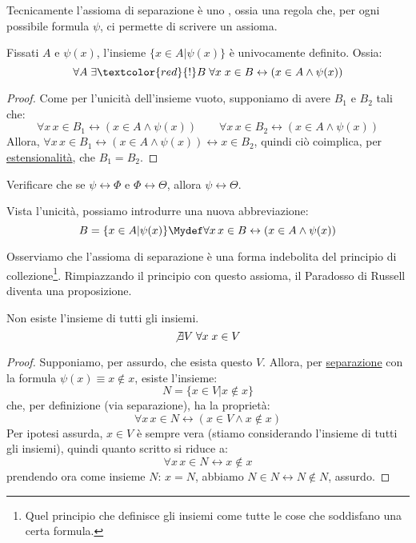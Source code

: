 \documentclass[11pt]{scrartcl}
\begin{document}
\begin{note}
Tecnicamente l'assioma di separazione è uno , ossia una regola che, per ogni possibile formula $\psi$, ci permette di scrivere un assioma.
\end{note}

\begin{proposition}
Fissati $A$ e $\psi(x)$, l'insieme $\{x \in A | \psi(x)\}$ è univocamente definito. Ossia:
\[ \forall A \; \exists \textcolor{red}{!} B \; \forall x \; x \in B \leftrightarrow (x \in A \land \psi(x))
	\]
\end{proposition}

\begin{proof}
Come per l'unicità dell'insieme vuoto, supponiamo di avere $B_1$ e $B_2$ tali che:
\[ \forall x \, x \in B_1 \leftrightarrow (x \in A \land \psi(x)) \qquad \forall x \, x \in B_2 \leftrightarrow (x \in A \land \psi(x))
	\]
Allora, $\forall x \, x \in B_1 \leftrightarrow (x \in A \land \psi(x)) \leftrightarrow x \in B_2$, quindi ciò coimplica, per \hyperref[ax2]{estensionalità}, che $B_1 = B_2$.
\end{proof}

\begin{exercise}
Verificare che se $\psi \leftrightarrow \Phi$ e $\Phi \leftrightarrow \Theta$, allora $\psi \leftrightarrow \Theta$.
\end{exercise}

\begin{notation}
Vista l'unicità, possiamo introdurre una nuova abbreviazione:
\[ B = \{x \in A | \psi(x)\} \Mydef \forall x \, x \in B \leftrightarrow (x \in A \land \psi(x))
	\]
\end{notation}

Osserviamo che l'assioma di separazione è una forma indebolita del principio di collezione\footnote{Quel principio che definisce gli insiemi come tutte le cose che soddisfano una certa formula.}. Rimpiazzando il principio con questo assioma, il Paradosso di Russell diventa una proposizione.

\begin{proposition}
Non esiste l'insieme di tutti gli insiemi.
\[ \not\exists V \; \forall x \; x \in V
	\]
\end{proposition}

\begin{proof}
Supponiamo, per assurdo, che esista questo $V$. Allora, per \hyperref[ax3]{separazione} con la formula $\psi (x) \equiv x \not \in x$, esiste l'insieme:
\[ N = \{x \in V | x \not\in x\}
	\]
che, per definizione (via separazione), ha la proprietà:
\[ \forall x \, x \in N \leftrightarrow (x \in V \land x \not \in x)
	\]
Per ipotesi assurda, $x \in V$ è sempre vera (stiamo considerando l'insieme di tutti gli insiemi), quindi quanto scritto si riduce a:
\[ \forall x \, x \in N \leftrightarrow x \not\in x
	\]
prendendo ora come insieme $N$: $x = N$, abbiamo $N \in N \leftrightarrow N \not\in N$, assurdo.
\end{proof}
\end{document}
